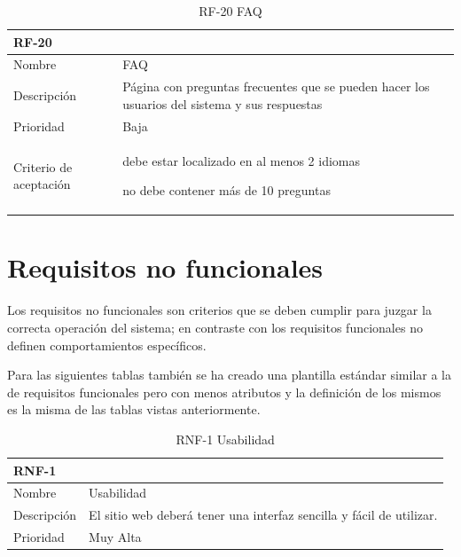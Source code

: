 \documentclass[11pt,spanish,listoffigures,listoftables]{tfgetsinf}
\begin{document}
\begin{table}[ht!]
	\centering
	\begin{tabular}{ |p{4cm}||p{10cm}|  }
		\multicolumn{2}{l}{\textbf{RF-20}} \\
		\hline
		Nombre   & FAQ \\
		\hline
		Descripción  & Página con preguntas frecuentes que se pueden hacer los usuarios del sistema y sus respuestas  \\
		\hline
		Prioridad &  Baja\\
		\hline
		Criterio de aceptación & 
		\begin{tabitem}
			\item debe estar localizado en al menos 2 idiomas
			\item no debe contener más de 10 preguntas
		\end{tabitem} \\
		\hline
	\end{tabular}
	\caption{RF-20 FAQ}
	\label{table:20}
\end{table}

\FloatBarrier

\section{Requisitos no funcionales}

Los requisitos no funcionales son criterios que se deben cumplir para juzgar la correcta operación del sistema; en contraste con los requisitos funcionales no definen comportamientos específicos. \par

Para las siguientes tablas también se ha creado una plantilla estándar similar a la de requisitos funcionales pero con menos atributos y la definición de los mismos es la misma de las tablas vistas anteriormente.

\begin{table}[ht!]
	\centering
	\begin{tabular}{ |p{4cm}||p{10cm}|  }
		\multicolumn{2}{l}{\textbf{RNF-1}} \\
		\hline
		Nombre   & Usabilidad \\
		\hline
		Descripción  & El sitio web deberá tener una interfaz sencilla y fácil de utilizar. \\
		\hline
		Prioridad &  Muy Alta \\
		\hline
	\end{tabular}
	\caption{RNF-1 Usabilidad}
	\label{table:21}
\end{table}
\end{document}
